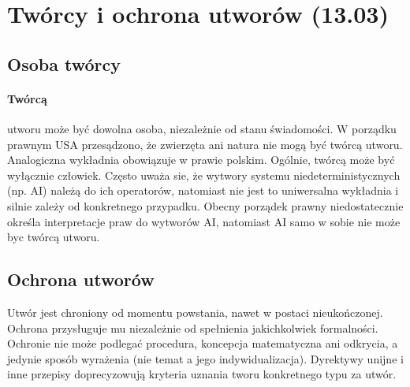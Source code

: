 \documentclass{article}
\begin{document}
\section{Twórcy i ochrona utworów (13.03)}

\subsection{Osoba twórcy}

\paragraph{Twórcą}
utworu może być dowolna osoba, niezależnie od stanu świadomości.
W porządku prawnym USA przesądzono, że zwierzęta ani natura nie mogą być twórcą utworu.
Analogiczna wykładnia obowiązuje w prawie polskim.
Ogólnie, twórcą może być wyłącznie człowiek.
Często uważa sie, że wytwory systemu niedeterministycznych (np. AI) należą do ich operatorów,
natomiast nie jest to uniwersalna wykładnia i silnie zależy od konkretnego przypadku.
Obecny porządek prawny niedostatecznie określa interpretacje praw do wytworów AI,
natomiast AI samo w sobie nie może byc twórcą utworu.

\subsection{Ochrona utworów}

Utwór jest chroniony od momentu powstania, nawet w postaci nieukończonej.
Ochrona przysługuje mu niezależnie od spełnienia jakichkolwiek formalności.
Ochronie nie może podlegać procedura, koncepcja matematyczna ani odkrycia,
a jedynie sposób wyrażenia (nie temat a jego indywidualizacja).
Dyrektywy unijne i inne przepisy doprecyzowują kryteria uznania tworu konkretnego typu za utwór.
\end{document}
